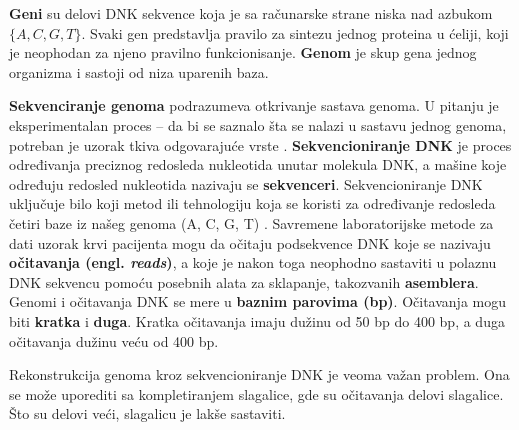 \documentclass[12pt,oneside]{memoir}
\begin{document}
\textbf{Geni} su delovi DNK sekvence koja je sa računarske strane niska nad azbukom $\{A, C, G, T\}$.  Svaki gen predstavlja pravilo za sintezu jednog proteina u ćeliji, koji je neophodan za njeno pravilno funkcionisanje. \textbf{Genom} je skup gena jednog organizma i sastoji od niza uparenih baza.

\textbf{Sekvenciranje genoma} podrazumeva otkrivanje sastava genoma. U pitanju je eksperimentalan
proces – da bi se saznalo šta se nalazi u sastavu jednog genoma, potreban je uzorak tkiva
odgovarajuće vrste \cite{skriptaBio}. \textbf{Sekvencioniranje DNK} je proces određivanja preciznog redosleda nukleotida unutar molekula DNK, a mašine koje određuju redosled nukleotida nazivaju se \textbf{sekvenceri}. Sekvencioniranje DNK uključuje bilo koji metod ili tehnologiju koja se koristi za određivanje redosleda četiri baze iz našeg genoma (A, C, G, T) \cite{DataAlgorithms}. Savremene laboratorijske metode za dati uzorak krvi pacijenta mogu da očitaju podsekvence DNK koje se nazivaju \textbf{očitavanja (engl. \textit{reads})}, a koje je nakon toga neophodno sastaviti u polaznu DNK sekvencu pomoću posebnih alata za sklapanje, takozvanih \textbf{asemblera}. Genomi i očitavanja DNK se mere u \textbf{baznim parovima (bp)}. Očitavanja mogu biti  \textbf{kratka} i \textbf{duga}. Kratka očitavanja imaju dužinu od 50 bp do 400 bp, a duga očitavanja dužinu veću od 400 bp.

Rekonstrukcija genoma kroz sekvencioniranje DNK je veoma važan problem. Ona se može uporediti sa kompletiranjem slagalice, gde su očitavanja delovi slagalice. Što su delovi veći, slagalicu je lakše sastaviti.

\begin{comment}
Rekonstrukcija genoma kroz sekvencioniranje DNK je veoma važan problem u genomici. Postojeće biotehnologije ne mogu proći kroz ceo hromozom, jer je predugačak. Umesto toga, genom se rekonstruiše indirektno. Prvo, vrši se razbijanje genoma na DNK fragmente koristeći pristup očitavanja celog sekvencioniranog genoma (engl. \textit{whole genome shotgun approach}). Zatim se pomoću mašine za sekvencioniranje na osnovu fragmenata vrši dekodiranje DNK sekvence. Ove DNK sekvence se nazivaju \textbf{očitavanja (engl. \textit{reads})}. Usled slučajnog uzorkovanja , ekstahovana očitavanja pokrivaju ceo genom ravnomerno. Lepljenjem ovih očitavanja možemo računski rekonstruisati genom. Ovaj proces je poznat kao \textbf{\textit{de novo} genomsko sekvencioniranje}.
\end{comment}
\end{document}
